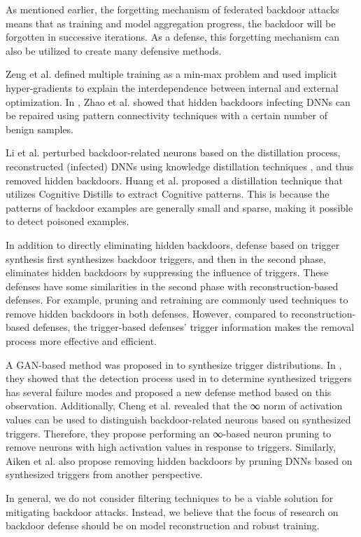 \documentclass[conference]{IEEEtran}
\begin{document}
As mentioned earlier, the forgetting mechanism of federated backdoor attacks means that as training and model aggregation progress,
the backdoor will be forgotten in successive iterations. As a defense, this forgetting mechanism can also be utilized to create many defensive methods.

Zeng et al. \cite{b90}defined multiple training as a min-max problem and used implicit hyper-gradients to
explain the interdependence between internal and external optimization.
In \cite{b91}, Zhao et al. showed that hidden backdoors infecting DNNs can be repaired using pattern connectivity techniques with a certain number of benign samples.

Li et al. \cite{b92} perturbed backdoor-related neurons based on the distillation process, reconstructed (infected) DNNs using knowledge
distillation techniques , and thus removed hidden backdoors.
Huang et al. \cite{b109} proposed a distillation technique that utilizes Cognitive Distills to extract Cognitive patterns.
This is because the patterns of backdoor examples are generally small and sparse, making it possible to detect poisoned examples.


In addition to directly eliminating hidden backdoors, defense based on trigger synthesis first
synthesizes backdoor triggers, and then in the second phase, eliminates hidden backdoors by suppressing the influence of triggers.
These defenses have some similarities in the second phase with reconstruction-based defenses. For example,
pruning and retraining are commonly used techniques to remove hidden backdoors in both defenses. However,
compared to reconstruction-based defenses, the trigger-based defenses' trigger information makes the removal process more effective and efficient.

A GAN-based method was proposed in \cite{b93} to synthesize trigger distributions.
In \cite{b94}, they showed that the detection process used in \cite{b95} to determine synthesized
triggers has several failure modes and proposed a new defense method based on this observation.
Additionally, Cheng et al. \cite{b96} revealed that the ∞ norm of activation values can be used to
distinguish backdoor-related neurons based on synthesized triggers. Therefore, they propose performing an
∞-based neuron pruning to remove neurons with high activation values in response to triggers.
Similarly, Aiken et al.\cite{b97} also propose removing hidden backdoors
by pruning DNNs based on synthesized triggers from another perspective.

In general, we do not consider filtering techniques to be a viable solution for mitigating backdoor attacks.
Instead, we believe that the focus of research on backdoor defense should be on model reconstruction and robust training.
\end{document}
